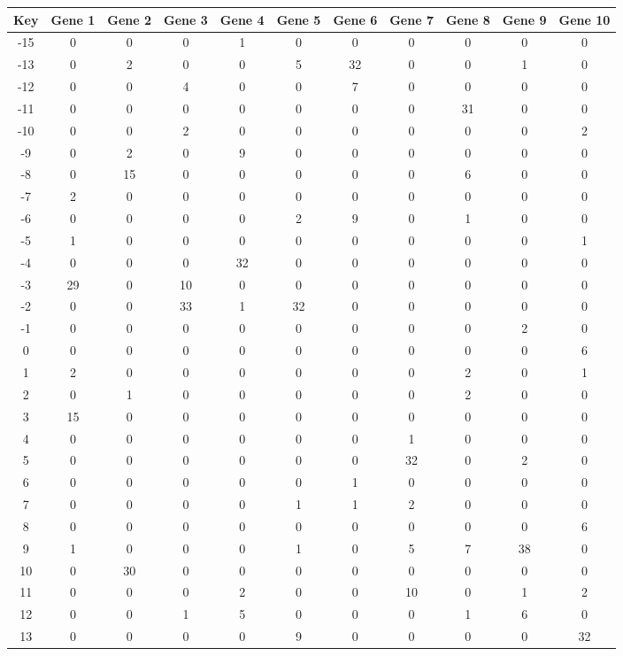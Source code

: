 \begin{tabular}{|c|c|c|c|c|c|c|c|c|c|c|}
\hline
Key & Gene 1 & Gene 2 & Gene 3 & Gene 4 & Gene 5 & Gene 6 & Gene 7 & Gene 8 & Gene 9 & Gene 10 \\
\hline
-15 & 0 & 0 & 0 & 1 & 0 & 0 & 0 & 0 & 0 & 0 \\
-13 & 0 & 2 & 0 & 0 & 5 & 32 & 0 & 0 & 1 & 0 \\
-12 & 0 & 0 & 4 & 0 & 0 & 7 & 0 & 0 & 0 & 0 \\
-11 & 0 & 0 & 0 & 0 & 0 & 0 & 0 & 31 & 0 & 0 \\
-10 & 0 & 0 & 2 & 0 & 0 & 0 & 0 & 0 & 0 & 2 \\
-9 & 0 & 2 & 0 & 9 & 0 & 0 & 0 & 0 & 0 & 0 \\
-8 & 0 & 15 & 0 & 0 & 0 & 0 & 0 & 6 & 0 & 0 \\
-7 & 2 & 0 & 0 & 0 & 0 & 0 & 0 & 0 & 0 & 0 \\
-6 & 0 & 0 & 0 & 0 & 2 & 9 & 0 & 1 & 0 & 0 \\
-5 & 1 & 0 & 0 & 0 & 0 & 0 & 0 & 0 & 0 & 1 \\
-4 & 0 & 0 & 0 & 32 & 0 & 0 & 0 & 0 & 0 & 0 \\
-3 & 29 & 0 & 10 & 0 & 0 & 0 & 0 & 0 & 0 & 0 \\
-2 & 0 & 0 & 33 & 1 & 32 & 0 & 0 & 0 & 0 & 0 \\
-1 & 0 & 0 & 0 & 0 & 0 & 0 & 0 & 0 & 2 & 0 \\
0 & 0 & 0 & 0 & 0 & 0 & 0 & 0 & 0 & 0 & 6 \\
1 & 2 & 0 & 0 & 0 & 0 & 0 & 0 & 2 & 0 & 1 \\
2 & 0 & 1 & 0 & 0 & 0 & 0 & 0 & 2 & 0 & 0 \\
3 & 15 & 0 & 0 & 0 & 0 & 0 & 0 & 0 & 0 & 0 \\
4 & 0 & 0 & 0 & 0 & 0 & 0 & 1 & 0 & 0 & 0 \\
5 & 0 & 0 & 0 & 0 & 0 & 0 & 32 & 0 & 2 & 0 \\
6 & 0 & 0 & 0 & 0 & 0 & 1 & 0 & 0 & 0 & 0 \\
7 & 0 & 0 & 0 & 0 & 1 & 1 & 2 & 0 & 0 & 0 \\
8 & 0 & 0 & 0 & 0 & 0 & 0 & 0 & 0 & 0 & 6 \\
9 & 1 & 0 & 0 & 0 & 1 & 0 & 5 & 7 & 38 & 0 \\
10 & 0 & 30 & 0 & 0 & 0 & 0 & 0 & 0 & 0 & 0 \\
11 & 0 & 0 & 0 & 2 & 0 & 0 & 10 & 0 & 1 & 2 \\
12 & 0 & 0 & 1 & 5 & 0 & 0 & 0 & 1 & 6 & 0 \\
13 & 0 & 0 & 0 & 0 & 9 & 0 & 0 & 0 & 0 & 32 \\
\hline
\end{tabular}